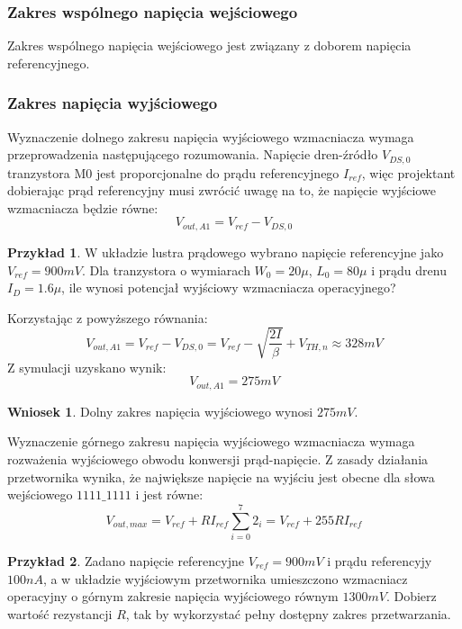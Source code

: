 \documentclass[10pt,a4paper,twoside]{report}
\theoremstyle{definition}
\theoremstyle{definition}
\theoremstyle{definition}
\newtheorem{przyklad}{Przykład}[section]
\theoremstyle{definition}
\theoremstyle{definition}
\newtheorem{wniosek}{Wniosek}[section]
\begin{document}
{{{{{{	\subsubsection{Zakres wspólnego napięcia wejściowego}
	{	Zakres wspólnego napięcia wejściowego jest związany z doborem napięcia referencyjnego.}
	\subsubsection{Zakres napięcia wyjściowego}
	{	Wyznaczenie dolnego zakresu napięcia wyjściowego wzmacniacza wymaga przeprowadzenia następującego rozumowania. Napięcie dren-źródło $V_{DS,0}$ tranzystora M0 jest proporcjonalne do prądu referencyjnego $I_{ref}$, więc projektant dobierając prąd referencyjny musi zwrócić uwagę na to, że napięcie wyjściowe wzmacniacza będzie równe:
		\begin{equation}
			V_{out,A1} = V_{ref} - V_{DS,0}
		\end{equation} 
	\begin{przyklad}{W układzie lustra prądowego wybrano napięcie referencyjne jako $V_{ref} = 900mV$. Dla tranzystora o wymiarach $W_0=20\mu$, $L_0=80\mu$ i prądu drenu $I_{D}=1.6\mu$, ile wynosi potencjał wyjściowy wzmacniacza operacyjnego?}
		
	{Korzystając z powyższego równania:
		\begin{equation}
			V_{out,A1} = V_{ref} - V_{DS,0} = V_{ref} - \sqrt{\frac{2I}{\beta}} +V_{TH,n} \approx 328 mV
		\end{equation}
	Z symulacji uzyskano wynik:
		\begin{equation}
			V_{out,A1} = 275mV
		\end{equation}
	}
	\end{przyklad}
	\begin{wniosek}{Dolny zakres napięcia wyjściowego wynosi $275mV$.}
	\end{wniosek}
	
	{	Wyznaczenie górnego zakresu napięcia wyjściowego wzmacniacza wymaga rozważenia wyjściowego obwodu konwersji prąd-napięcie. Z zasady działania przetwornika wynika, że największe napięcie na wyjściu jest obecne dla słowa wejściowego $1111\_1111$ i jest równe:
	\begin{equation}
		V_{out,max} = V_{ref} + R I_{ref} \sum_{i=0}^{7} 2_i = V_{ref} + 255 R I_{ref} 
	\end{equation}
	\begin{przyklad}{Zadano napięcie referencyjne $V_{ref}=900mV$ i prądu referencyjy $100nA$, a w układzie wyjściowym przetwornika umieszczono wzmacniacz operacyjny o górnym zakresie napięcia wyjściowego równym $1300mV$. Dobierz wartość rezystancji $R$, tak by wykorzystać pełny dostępny zakres przetwarzania.}
		

\end{przyklad}}}}}}}}}
\end{document}
